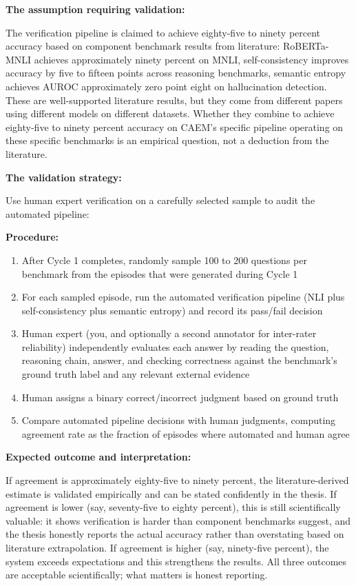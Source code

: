 \documentclass[11pt,a4paper]{article}
\newcommand{\implementbox}[2]{%
\begin{tcolorbox}[enhanced,breakable,
  colback=LightSlate,colframe=Slate,boxrule=1.5pt,arc=4pt,
  left=8pt,right=8pt,top=6pt,bottom=6pt,
  title={\bfseries\small\color{white}#1},
  attach boxed title to top left={yshift=-2mm,xshift=6mm},
  boxed title style={colback=Slate,arc=3pt,boxrule=0pt,
    left=4pt,right=4pt,top=2pt,bottom=2pt}]
#2
\end{tcolorbox}}
\begin{document}
\implementbox{IMPLEMENTATION CONCERN 4: Human Audit to Calibrate Verification Accuracy Claims}{
\textbf{The assumption requiring validation:}

The verification pipeline is claimed to achieve eighty-five to ninety percent accuracy based on component benchmark results from literature: RoBERTa-MNLI achieves approximately ninety percent on MNLI, self-consistency improves accuracy by five to fifteen points across reasoning benchmarks, semantic entropy achieves AUROC approximately zero point eight on hallucination detection. These are well-supported literature results, but they come from different papers using different models on different datasets. Whether they combine to achieve eighty-five to ninety percent accuracy on CAEM's specific pipeline operating on these specific benchmarks is an empirical question, not a deduction from the literature.

\textbf{The validation strategy:}

Use human expert verification on a carefully selected sample to audit the automated pipeline:

\textbf{Procedure:}
\begin{enumerate}
\item After Cycle 1 completes, randomly sample 100 to 200 questions per benchmark from the episodes that were generated during Cycle 1
\item For each sampled episode, run the automated verification pipeline (NLI plus self-consistency plus semantic entropy) and record its pass/fail decision
\item Human expert (you, and optionally a second annotator for inter-rater reliability) independently evaluates each answer by reading the question, reasoning chain, answer, and checking correctness against the benchmark's ground truth label and any relevant external evidence
\item Human assigns a binary correct/incorrect judgment based on ground truth
\item Compare automated pipeline decisions with human judgments, computing agreement rate as the fraction of episodes where automated and human agree
\end{enumerate}

\textbf{Expected outcome and interpretation:}

If agreement is approximately eighty-five to ninety percent, the literature-derived estimate is validated empirically and can be stated confidently in the thesis. If agreement is lower (say, seventy-five to eighty percent), this is still scientifically valuable: it shows verification is harder than component benchmarks suggest, and the thesis honestly reports the actual accuracy rather than overstating based on literature extrapolation. If agreement is higher (say, ninety-five percent), the system exceeds expectations and this strengthens the results. All three outcomes are acceptable scientifically; what matters is honest reporting.

}
\end{document}

